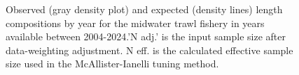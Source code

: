 \documentclass[
]{scrartcl}
\begin{document}
\begin{figure}[H]


\caption{\label{fig-len-fit-ntdis}Observed (gray density plot) and
expected (density lines) length compositions by year for the midwater
trawl fishery in years available between 2004-2024.'N adj.' is the input
sample size after data-weighting adjustment. N eff. is the calculated
effective sample size used in the McAllister-Ianelli tuning method.}

\end{figure}%
\end{document}
